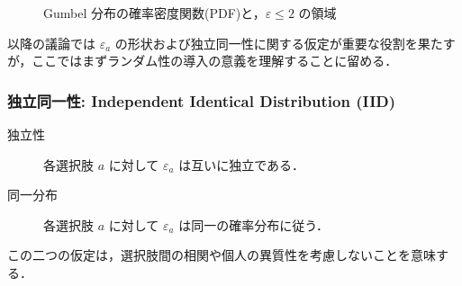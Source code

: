 \begin{figure}[hbtp]
  \centering
    \resizebox{.9\linewidth}{!}{%
    }
  \caption{Gumbel 分布の確率密度関数(PDF)と，$\varepsilon \le 2$ の領域}
  \label{fig:gumbel-pdf}
\end{figure}

以降の議論では $\varepsilon_a$ の形状および独立同一性に関する仮定が重要な役割を果たすが，ここではまずランダム性の導入の意義を理解することに留める．

\subsubsection{独立同一性: Independent Identical Distribution (IID)}
\begin{description}
  \item[独立性] 各選択肢 $a$ に対して $\varepsilon_a$ は互いに独立である．
  \item[同一分布] 各選択肢 $a$ に対して $\varepsilon_a$ は同一の確率分布に従う．
\end{description}
この二つの仮定は，選択肢間の相関や個人の異質性を考慮しないことを意味する．








